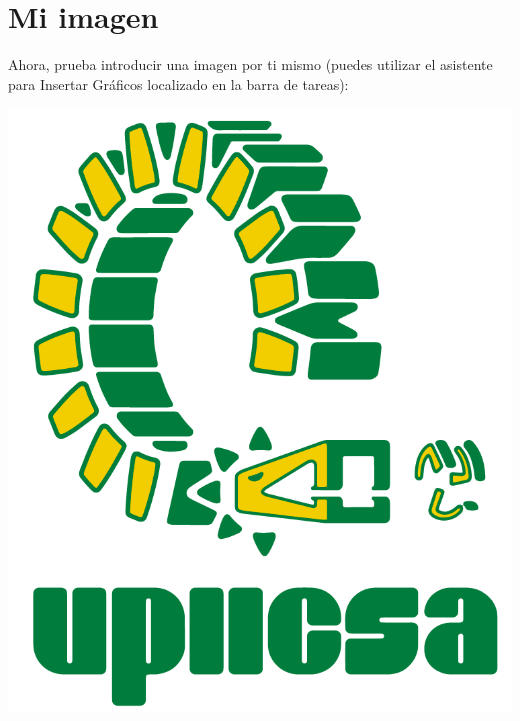 \documentclass[12pt]{article}
\begin{document}
\section{Mi imagen}

Ahora, prueba introducir una imagen por ti mismo (puedes utilizar el asistente para Insertar Gráficos localizado en la barra de tareas):

\begin{center}
	\includegraphics[width=0.7\linewidth]{img/Escudo-UPIICSA.png}
\end{center}
\end{document}
